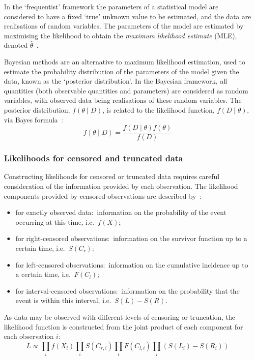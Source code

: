 In the `frequentist' framework the parameters of a statistical model are considered to have a fixed `true' unknown value to be estimated, and the data are realisations of random variables. The parameters of the model are estimated by maximising the likelihood to obtain the \textit{maximum likelihood estimate} (MLE), denoted $\hat{\theta}$~\parencite{Wasserman2004-gw}.

Bayesian methods are an alternative to maximum likelihood estimation, used to estimate the probability distribution of the parameters of the model given the data, known as the `posterior distribution'. In the Bayesian framework, all quantities (both observable quantities and parameters) are considered as random variables, with observed data being realisations of these random variables. The posterior distribution, $f(\theta \mid D)$, is related to the likelihood function, $f(D \mid \theta)$, via Bayes formula~\parencite{Wasserman2004-gw}:
%
\[
    f(\theta \mid D) = \frac{f(D \mid \theta)f(\theta)}{f(D)}
\]

\subsubsection{Likelihoods for censored and truncated data}\label{sec:likelihood}

Constructing likelihoods for censored or truncated data requires careful consideration of the information provided by each observation. The likelihood components provided by censored observations are described by~\cite{Klein2005-ls}:
%
\begin{itemize}
    \item for exactly observed data:\ information on the probability of the event occurring at this time, i.e.\ $f(X)$;
    \item for right-censored observations:\ information on the survivor function up to a certain time, i.e.\ $S(C_r)$;
    \item for left-censored observations:\ information on the cumulative incidence up to a certain time, i.e.\ $F(C_l)$;
    \item for interval-censored observations:\ information on the probability that the event is within this interval, i.e.\ $S(L) - S(R)$.
\end{itemize}

As data may be observed with different levels of censoring or truncation, the likelihood function is constructed from the joint product of each component for each observation $i$:
%
\[
    L \propto \prod_{i} f(X_i) \prod_{i} S(C_{r,i}) \prod_{i} F(C_{l,i}) \prod_i (S(L_i) - S(R_i))
\]

